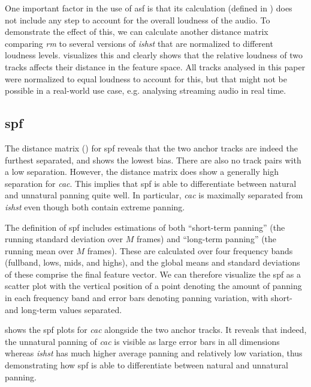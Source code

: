 \documentclass[twoside,a4paper]{article}
\newcommand{\RM}{\textit{\gls{rm}}}
\newcommand{\CAC}{\textit{\gls{cac}}}
\newcommand{\ISHST}{\textit{\gls{ishst}}}
\begin{document}
One important factor in the use of \gls{asf} is that its calculation (defined in \cite{tardieuProductionEffectAudio2011}) does not include any step to account for the overall loudness of the audio. To demonstrate the effect of this, we can calculate another distance matrix comparing \RM{} to several versions of \ISHST{} that are normalized to different loudness levels.  visualizes this and clearly shows that the relative loudness of two tracks affects their distance in the feature space. All tracks analysed in this paper were normalized to equal loudness to account for this, but that might not be possible in a real-world use case, e.g. analysing streaming audio in real time.


\subsection{\acrlong{spf} \cite{tzanetakisStereoPanningFeatures2007}}
\label{sec:results_spf}
The distance matrix () for \gls{spf} reveals that the two anchor tracks are indeed the furthest separated, and  shows the lowest bias. There are also no track pairs with a low separation. However, the distance matrix does show a generally high separation for \CAC{}. This implies that \gls{spf} is able to differentiate between natural and unnatural panning quite well. In particular, \CAC{} is maximally separated from \ISHST{} even though both contain extreme panning. 

The definition of \gls{spf} includes estimations of both \enquote{short-term panning} (the running standard deviation over $M$ frames) and \enquote{long-term panning} (the running mean over $M$ frames). These are calculated over four frequency bands (fullband, lows, mids, and highs), and the global means and standard deviations of these comprise the final feature vector. We can therefore visualize the \gls{spf} as a scatter plot with the vertical position of a point denoting the amount of panning in each frequency band and error bars denoting panning variation, with short- and long-term values separated. 

 shows the \gls{spf} plots for \CAC{} alongside the two anchor tracks. It reveals that indeed, the unnatural panning of \CAC{} is visible as large error bars in all dimensions whereas \ISHST{} has much higher average panning and relatively low variation, thus demonstrating how \gls{spf} is able to differentiate between natural and unnatural panning.
\end{document}
